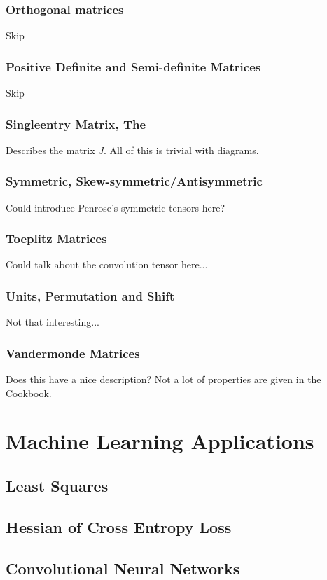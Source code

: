 \documentclass[oneside]{book}
\begin{document}
\subsection{Orthogonal matrices}
Skip
\subsection{Positive Definite and Semi-definite Matrices}
Skip
\subsection{Singleentry Matrix, The}
Describes the matrix $J$.
All of this is trivial with diagrams.
\subsection{Symmetric, Skew-symmetric/Antisymmetric}
Could introduce Penrose's symmetric tensors here?
\subsection{Toeplitz Matrices}
Could talk about the convolution tensor here...
\subsection{Units, Permutation and Shift}
Not that interesting...
\subsection{Vandermonde Matrices}
Does this have a nice description?
Not a lot of properties are given in the Cookbook.



\chapter{Machine Learning Applications}

\section{Least Squares}

\section{Hessian of Cross Entropy Loss}

\section{Convolutional Neural Networks}
\end{document}
